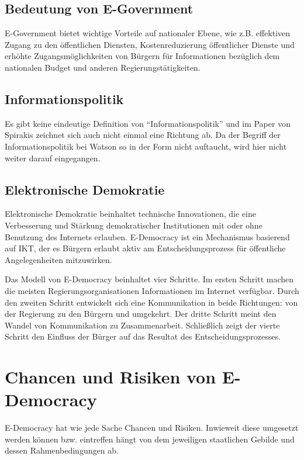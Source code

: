 \documentclass[12pt,twoside,ngerman]{scrartcl}
\theoremstyle{plain}
\theoremstyle{definition}
\theoremstyle{remark}
\begin{document}
\subsection*{Bedeutung von E-Government}

	E-Government bietet wichtige Vorteile auf nationaler Ebene, wie z.B. effektiven Zugang zu den öffentlichen Diensten, Kostenreduzierung öffentlicher Dienste und erhöhte Zugangsmöglichkeiten von Bürgern für Informationen bezüglich dem nationalen Budget und anderen Regierungstätigkeiten.\cite{Spirakis2010}
	
\subsection*{Informationspolitik}
	
	Es gibt keine eindeutige Definition von "`Informationspolitik"' und im Paper von Spirakis\cite{Spirakis2010} zeichnet sich auch nicht einmal eine Richtung ab. Da der Begriff der Informationspolitik bei Watson so in der Form nicht auftaucht, wird hier nicht weiter darauf eingegangen.
	
\subsection*{Elektronische Demokratie}

	Elektronische Demokratie beinhaltet technische Innovationen, die eine Verbesserung und Stärkung demokratischer Institutionen mit oder ohne Benutzung des Internets erlauben. E-Democracy ist ein Mechanismus basierend auf IKT, der es Bürgern erlaubt aktiv am Entscheidungsprozess für öffentliche Angelegenheiten mitzuwirken.\cite{Spirakis2010}
	
	Das Modell von E-Democracy beinhaltet vier Schritte. Im ersten Schritt machen die meisten Regierungsorganisationen Informationen im Internet verfügbar. Durch den zweiten Schritt entwickelt sich eine Kommunikation in beide Richtungen: von der Regierung zu den Bürgern und umgekehrt. Der dritte Schritt meint den Wandel von Kommunikation zu Zusammenarbeit. Schließlich zeigt der vierte Schritt den Einfluss der Bürger auf das Resultat des Entscheidungsprozesses.\cite{Spirakis2010}

\section{Chancen und Risiken von E-Democracy}
\label{sec:chanceRisk}

	E-Democracy hat wie jede Sache Chancen und Risiken. Inwieweit diese umgesetzt werden können bzw. eintreffen hängt von dem jeweiligen staatlichen Gebilde und dessen Rahmenbedingungen ab.\cite{Spirakis2010}
	
\end{document}
